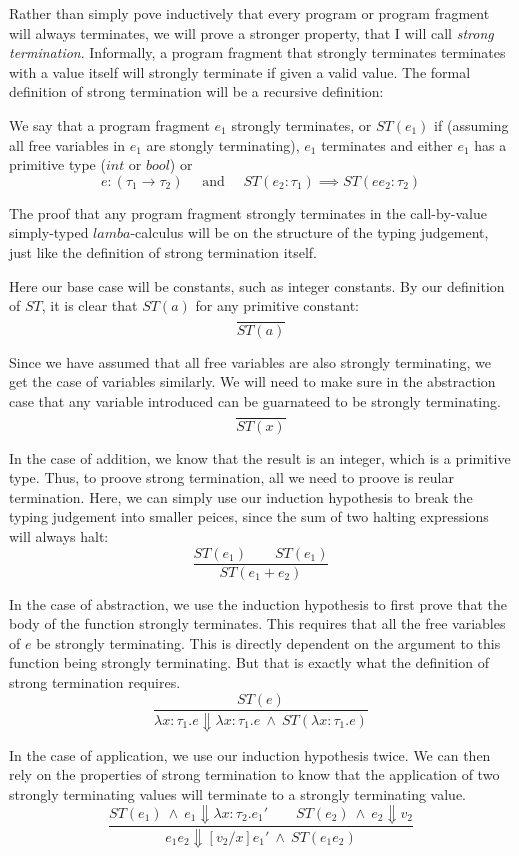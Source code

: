 \documentclass{article}
\begin{document}
Rather than simply pove inductively that every program or program fragment will
always terminates, we will prove a stronger property, that I will call
\emph{strong termination}.  Informally, a program fragment that strongly
terminates terminates with a value itself will strongly terminate if given a
valid value.  The formal definition of strong termination will be a recursive
definition:

We say that a program fragment $e_1$ strongly terminates, or $ST(e_1)$ if
(assuming all free variables in $e_1$ are stongly terminating), 
$e_1$ terminates and either $e_1$ has a primitive type ($int$ or $bool$)
or
\[
e : (\tau_1 \rightarrow \tau_2) \quad \text{ and }
\quad ST(e_2: \tau_1) \implies ST(e e_2 : \tau_2)
\]

The proof that any program fragment strongly terminates in the call-by-value
simply-typed $lamba$-calculus will be on the structure of the typing judgement,
just like the definition of strong termination itself.

Here our base case will be constants, such as integer constants.
By our definition of $ST$, it is clear that $ST(a)$ for any primitive constant:
\[
\frac{}{ST(a)}
\]

Since we have assumed that all free variables are also strongly terminating, we
get the case of variables similarly.  We will need to make sure in the
abstraction case that any variable introduced can be guarnateed to be strongly
terminating.
\[
\frac{}{ST(x)}
\]

In the case of addition, we know that the result is an integer, which is a
primitive type.  Thus, to proove strong termination, all we need to proove is
reular termination. Here, we can simply use our induction hypothesis
to break the typing judgement into smaller peices, since the sum of two halting
expressions will always halt:
\[
\frac{ST(e_1) \qquad ST(e_1)}
{ST(e_1 + e_2)}
\]

In the case of abstraction, we use the induction hypothesis to first prove that
the body of the function strongly terminates.  This requires that all the free
variables of $e$ be strongly terminating.  This is directly dependent on the
argument to this function being strongly terminating.  But that is exactly what
the definition of strong termination requires.
\[
\frac{ST(e)}
{\lambda x:\tau_1. e \Downarrow \lambda x:\tau_1. e
\ \wedge\ ST(\lambda x:\tau_1.e) }
\]

In the  case of application, we use our induction hypothesis twice.  We can
then rely on the properties of strong termination to know that the application
of two strongly terminating values will terminate to a strongly terminating
value.
\[
\frac{ST(e_1)\ \wedge\ e_1 \Downarrow \lambda x:\tau_2. e_1'
\qquad
ST(e_2)\ \wedge\ e_2 \Downarrow v_2 }
{e_1 e_2 \Downarrow [v_2/x]e_1' \ \wedge\ ST(e_1 e_2)}
\]
\end{document}
